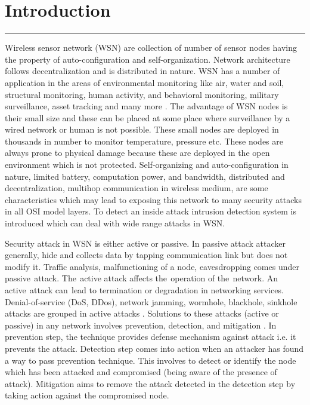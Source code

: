 \chapter{Introduction}
\label{C1} %
\graphicspath{{Figures/PDF/}{Figures/PNG/}}
\noindent\rule{\linewidth}{2pt}

\noindent Wireless sensor network (WSN) are collection of number of sensor nodes having the property of auto-configuration and self-organization. Network architecture follows decentralization and is distributed in nature. WSN has a number of application in the areas of environmental monitoring like air, water and soil, structural monitoring, human activity, and behavioral monitoring, military surveillance, asset tracking and many more \cite{akyildiz2002wireless}. The advantage of WSN nodes is their small size and these can be placed at some place where surveillance by a wired network or human is not possible. These small nodes are deployed in thousands in number to monitor temperature, pressure etc. These nodes are always prone to physical damage because these are deployed in the open environment which is not protected. Self-organizing and auto-configuration in nature, limited battery, computation power, and bandwidth, distributed and decentralization, multihop communication in wireless medium, are some characteristics which may lead to exposing this network to many security attacks in all OSI model layers. To detect an inside attack intrusion detection system is introduced which can deal with wide range attacks in WSN.
\par
Security attack in WSN is either active or passive. In passive attack attacker generally, hide and collects data by tapping communication link but does not modify it. Traffic analysis, malfunctioning of a node, eavesdropping comes under passive\textcolor{white}{e}attack. The\textcolor{white}{e}active attack affects the\textcolor{white}{e}operation of the\textcolor{white}{e}network. An active\textcolor{white}{e}attack can\textcolor{white}{e}lead to termination or degradation in networking services. Denial-of-service (DoS, DDos), network jamming, wormhole, blackhole, sinkhole attacks are grouped in active attacks \cite{padmavathi2009survey}. Solutions to these attacks (active or passive) in any network involves prevention, detection, and mitigation \cite{fuchsberger2005intrusion}. In prevention step, the technique provides defense mechanism against attack i.e. it prevents the attack. Detection step comes into action when an attacker has found a way to pass prevention technique. This involves to detect or identify the node which has been attacked and compromised (being aware of the presence of attack). Mitigation aims to remove the attack detected in the detection step by taking action against the compromised node.
